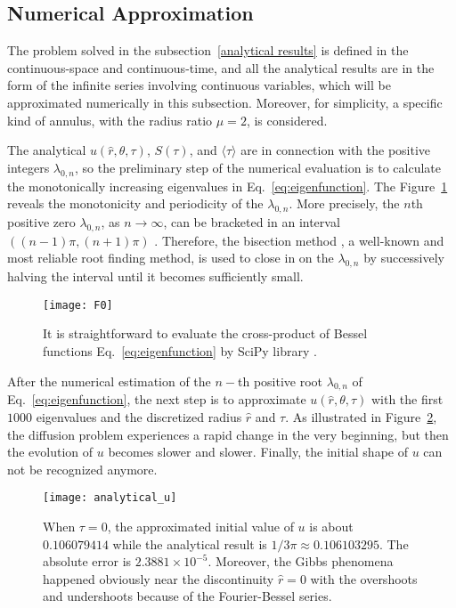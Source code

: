 \subsection{Numerical Approximation}\label{numerical approximation}

The problem solved in the subsection~\ref{analytical results} is
defined in the continuous-space and continuous-time, and all the
analytical results are in the form of the infinite series involving
continuous variables, which will be approximated numerically in this
subsection. Moreover, for simplicity, a specific kind of annulus, with
the radius ratio $\mu=2$, is considered.

The analytical $u(\hat r, \theta, \tau)$, $S(\tau)$, and
$\langle \tau \rangle$ are in connection with the positive integers
$\lambda_{0,n}$, so the preliminary step of the numerical evaluation
is to calculate the monotonically increasing eigenvalues in
Eq.~\ref{eq:eigenfunction}.  The Figure~\ref{fig:F0} reveals the
monotonicity and periodicity of the $\lambda_{0,n}$. More precisely,
the $n$th positive zero $\lambda_{0,n}$, as $n \rightarrow \infty $,
can be bracketed in an interval $((n-1) \pi,
(n+1) \pi)$ \cite{NIST:DLMF}. Therefore, the bisection
method \cite{2020SciPy-NMeth}, a well-known and most reliable root
finding method, is used to close in on the $\lambda_{0,n}$ by
successively halving the interval until it becomes sufficiently small.

\begin{figure}
\centering
\texttt{[image: F0]}
\caption{It is straightforward to evaluate the cross-product of
Bessel functions Eq.~\ref{eq:eigenfunction} by SciPy
library \cite{2020SciPy-NMeth}. \label{fig:F0}}
\end{figure}


After the numerical estimation of the $n-$th positive root
$\lambda_{0,n}$ of Eq.~\ref{eq:eigenfunction}, the next step is to
approximate $u(\hat r, \theta, \tau)$ with the first $1000$
eigenvalues and the discretized radius $\hat r$ and $\tau$. As
illustrated in Figure~\ref{fig:u}, the diffusion problem experiences a
rapid change in the very beginning, but then the evolution of $u$
becomes slower and slower. Finally, the initial shape of $u$ can not
be recognized anymore.

\begin{figure}
\centering
\texttt{[image: analytical\_u]}
\caption{When $\tau=0$, the approximated initial value of $u$ is about $0.106079414$ while the analytical result is $1/3\pi \approx 0.106103295$. The absolute error is $2.3881 \times 10^{-5}$. Moreover, the Gibbs phenomena \cite{fay2003gibbs} happened obviously near the discontinuity $\hat r = 0$ with the overshoots and undershoots because of the Fourier-Bessel series. \label{fig:u}}
\end{figure}

